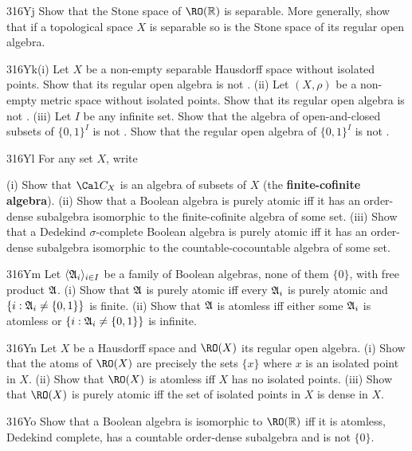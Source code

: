 {\spheader 316Yj
Show that the Stone space of $\RO(\Bbb R)$ is separable.
More generally, show
that if a topological space $X$ is separable so is the Stone space of
its regular open algebra.

\spheader 316Yk(i) Let $X$ be a non-empty separable
Hausdorff space
without isolated points.   Show that its regular open algebra is not
\wsid.   (ii)
Let $(X,\rho)$ be a non-empty metric space without isolated points.
Show that its regular open algebra is not \wsid.   (iii) Let $I$ be any
infinite
set.   Show that the algebra of open-and-closed subsets of $\{0,1\}^I$
is not \wsid.   Show that the regular open algebra of $\{0,1\}^I$ is not
\wsid.


\spheader 316Yl For any set $X$, write


\noindent (i) Show that $\Cal C_X$ is an algebra of subsets of $X$ (the
{\bf finite-cofinite algebra}).   (ii) Show that a Boolean algebra is
purely atomic iff it has an order-dense subalgebra isomorphic  to the
finite-cofinite algebra of some set.   (iii) Show that a Dedekind
$\sigma$-complete Boolean algebra is purely atomic iff it has an
order-dense subalgebra isomorphic to the countable-cocountable algebra
of some set.

\spheader 316Ym Let $\langle\frak A_i\rangle_{i\in I}$ be a family
of Boolean algebras, none of them $\{0\}$, with free product $\frak A$.
(i) Show that $\frak A$ is purely atomic iff every $\frak A_i$ is purely
atomic and $\{i:\frak A_i\ne\{0,1\}\}$ is finite.   (ii) Show that
$\frak A$ is atomless iff either some $\frak A_i$ is atomless or
$\{i:\frak A_i\ne\{0,1\}\}$ is infinite.

\spheader 316Yn
Let $X$ be a Hausdorff space and $\RO(X)$ its
regular open algebra.   (i) Show that the atoms of $\RO(X)$ are
precisely
the sets $\{x\}$ where $x$ is an isolated point in $X$.  (ii) Show that
$\RO(X)$ is atomless iff $X$ has no isolated points.   (iii) Show that
$\RO(X)$ is purely atomic iff the set of isolated points in $X$ is
dense in $X$.

\spheader 316Yo Show that a Boolean algebra is isomorphic to
$\RO(\Bbb R)$ iff it is atomless, Dedekind complete,
has a countable order-dense subalgebra and is not $\{0\}$.

}

